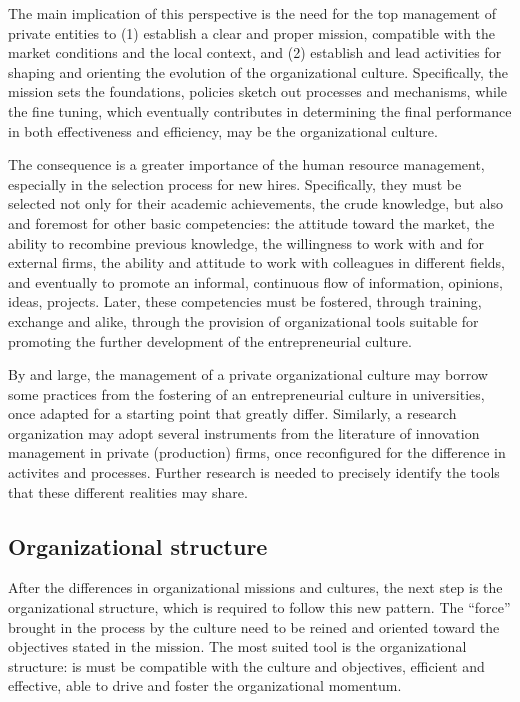 The main implication of this perspective is the need for the top management of private entities to (1) establish a clear and proper mission, compatible with the market conditions and the local context, and (2) establish and lead activities for shaping and orienting the evolution of the organizational culture. Specifically, the mission sets the foundations, policies sketch out processes and mechanisms, while the fine tuning, which eventually contributes in determining the final performance in both effectiveness and efficiency, may be the organizational culture.

The consequence is a greater importance of the human resource management, especially in the selection process for new hires. Specifically, they must be selected not only for their academic achievements, the crude knowledge, but also and foremost for other basic competencies: the attitude toward the market, the ability to recombine previous knowledge, the willingness to work with and for external firms, the ability and attitude to work with colleagues in different fields, and eventually to promote an informal, continuous flow of information, opinions, ideas, projects. Later, these competencies must be fostered, through training, exchange and alike, through the provision of organizational tools suitable for promoting the further development of the entrepreneurial culture. 

By and large, the management of a private organizational culture may borrow some practices from the fostering of an entrepreneurial culture in universities, once adapted for a starting point that greatly differ. Similarly, a research organization may adopt several instruments from the literature of innovation management in private (production) firms, once reconfigured for the difference in activites and processes. Further research is needed to precisely identify the tools that these different realities may share.

\subsection{Organizational structure}

After the differences in organizational missions and cultures, the next step is the organizational structure, which is required to follow this new pattern. The \enquote{force} brought in the process by the culture need to be reined and oriented toward the objectives stated in the mission. The most suited tool is the organizational structure: is must be compatible with the culture and objectives, efficient and effective, able to drive and foster the organizational momentum. 

